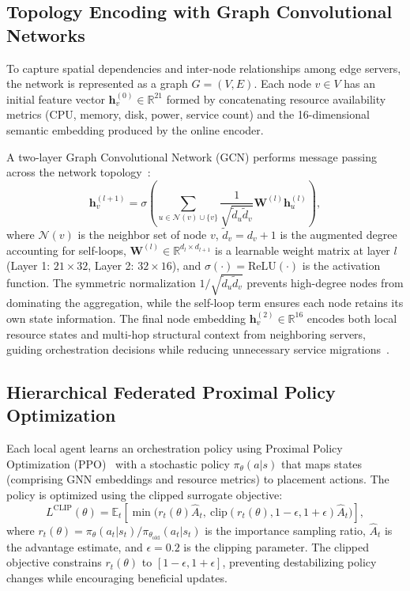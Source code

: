 \documentclass[conference]{IEEEtran}
\begin{document}
	\subsection{Topology Encoding with Graph Convolutional Networks}
	\textcolor{revblue}{To capture spatial dependencies and inter-node relationships among edge servers, the network is represented as a graph $G = (V, E)$. Each node $v \in V$ has an initial feature vector $\mathbf{h}_v^{(0)} \in \mathbb{R}^{21}$ formed by concatenating resource availability metrics (CPU, memory, disk, power, service count) and the 16-dimensional semantic embedding produced by the online encoder.}
	
	A two-layer Graph Convolutional Network (GCN) performs message passing across the network topology~\cite{wang2024deepgrl}:
	\begin{equation}
		\mathbf{h}_v^{(l+1)} = \sigma\!\left(\sum_{u \in \mathcal{N}(v) \cup \{v\}} \frac{1}{\sqrt{\tilde{d}_u \tilde{d}_v}} \mathbf{W}^{(l)} \mathbf{h}_u^{(l)}\right),
	\end{equation}
	\textcolor{revblue}{where $\mathcal{N}(v)$ is the neighbor set of node $v$, $\tilde{d}_v = d_v + 1$ is the augmented degree accounting for self-loops, $\mathbf{W}^{(l)} \in \mathbb{R}^{d_l \times d_{l+1}}$ is a learnable weight matrix at layer $l$ (Layer 1: $21 \times 32$, Layer 2: $32 \times 16$), and $\sigma(\cdot) = \text{ReLU}(\cdot)$ is the activation function. The symmetric normalization $1/\sqrt{\tilde{d}_u \tilde{d}_v}$ prevents high-degree nodes from dominating the aggregation, while the self-loop term ensures each node retains its own state information. The final node embedding $\mathbf{h}_v^{(2)} \in \mathbb{R}^{16}$ encodes both local resource states and multi-hop structural context from neighboring servers, guiding orchestration decisions while reducing unnecessary service migrations~\cite{moreira2024vne}.}
	
	
	\subsection{Hierarchical Federated Proximal Policy Optimization}
	Each local agent learns an orchestration policy using Proximal Policy Optimization (PPO)~\cite{robles2023multilayer} with a stochastic policy $\pi_{\theta}(a|s)$ that maps states (comprising GNN embeddings and resource metrics) to placement actions. The policy is optimized using the clipped surrogate objective:
	\begin{equation}
		L^{\text{CLIP}}(\theta) = \mathbb{E}_t\!\left[\min\!\big(r_t(\theta)\hat{A}_t, \ \text{clip}(r_t(\theta), 1-\epsilon, 1+\epsilon)\hat{A}_t\big)\right],
	\end{equation}
	where $r_t(\theta) = \pi_\theta(a_t|s_t)/\pi_{\theta_{\text{old}}}(a_t|s_t)$ is the importance sampling ratio, $\hat{A}_t$ is the advantage estimate, and $\epsilon = 0.2$ is the clipping parameter. The clipped objective constrains $r_t(\theta)$ to $[1-\epsilon, 1+\epsilon]$, preventing destabilizing policy changes while encouraging beneficial updates.
	
\end{document}
